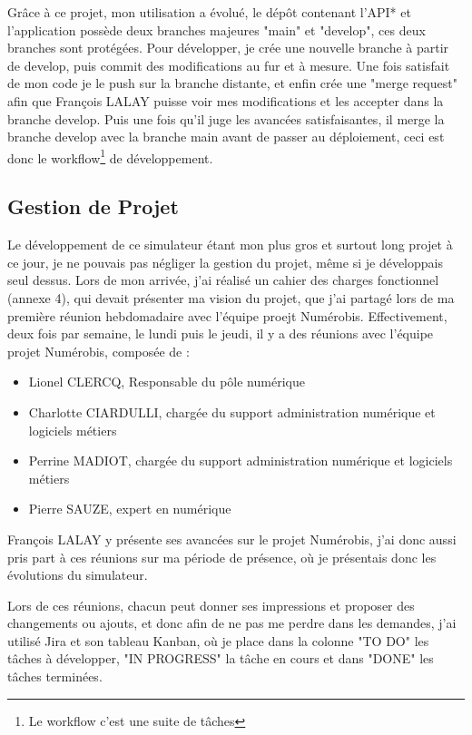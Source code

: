 \documentclass[a4paper,12pt]{report}
\begin{document}
Grâce à ce projet, mon utilisation a évolué, le dépôt contenant l'API* et l'application possède deux branches majeures "main" et "develop", ces deux branches sont protégées. Pour développer, je crée une nouvelle branche à partir de develop, puis commit des modifications au fur et à mesure. Une fois satisfait de mon code je le push sur la branche distante, et enfin crée une "merge request" afin que François LALAY puisse voir mes modifications et les accepter dans la branche develop. Puis une fois qu'il juge les avancées satisfaisantes, il merge la branche develop avec la branche main avant de passer au déploiement, ceci est donc le workflow\footnote{Le workflow c'est une suite de tâches} de développement.

\subsection{Gestion de Projet}
Le développement de ce simulateur étant mon plus gros et surtout long projet à ce jour, je ne pouvais pas négliger la gestion du projet, même si je développais seul dessus. Lors de mon arrivée, j'ai réalisé un cahier des charges fonctionnel (annexe 4), qui devait présenter ma vision du projet, que j'ai partagé lors de ma première réunion hebdomadaire avec l'équipe proejt Numérobis. Effectivement, deux fois par semaine, le lundi puis le jeudi, il y a des réunions avec l'équipe projet Numérobis, composée de :
\begin{itemize}
    \item Lionel CLERCQ, Responsable du pôle numérique
    \item Charlotte CIARDULLI, chargée du support administration numérique et logiciels métiers
    \item Perrine MADIOT, chargée du support administration numérique et logiciels métiers
    \item Pierre SAUZE, expert en numérique
\end{itemize}
François LALAY y présente ses avancées sur le projet Numérobis, j'ai donc aussi pris part à ces réunions sur ma période de présence, où je présentais donc les évolutions du simulateur. 


Lors de ces réunions, chacun peut donner ses impressions et proposer des changements ou ajouts, et donc afin de ne pas me perdre dans les demandes, j'ai utilisé Jira et son tableau Kanban, où je place dans la colonne "TO DO" les tâches à développer, "IN PROGRESS" la tâche en cours et dans "DONE" les tâches terminées.
\end{document}
